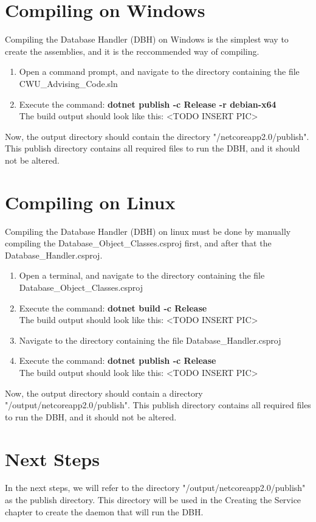 \documentclass[letterpaper]{report}
\begin{document}
	\section{Compiling on Windows}
	Compiling the Database Handler (DBH) on Windows is the simplest way to create the assemblies, and it is the reccommended way of compiling. 
	\begin{enumerate}
		\item Open a command prompt, and navigate to the directory containing the file CWU\_Advising\_Code.sln
		\item Execute the command: \textbf{dotnet publish -c Release -r debian-x64 }\\ The build output should look like this: <TODO INSERT PIC> \\
	\end{enumerate}
	Now, the output directory should contain the directory "/netcoreapp2.0/publish". This publish directory contains all required files to run the DBH, and it should not be altered.
	\section{Compiling on Linux}
	Compiling the Database Handler (DBH) on linux must be done by manually compiling the Database\_Object\_Classes.csproj first, and after that the Database\_Handler.csproj. 
	\begin{enumerate}
		\item Open a terminal, and navigate to the directory containing the file Database\_Object\_Classes.csproj
		\item Execute the command: \textbf{dotnet build -c Release}\\ The build output should look like this: <TODO INSERT PIC> \\
		\item Navigate to the directory containing the file Database\_Handler.csproj
		\item Execute the command: \textbf{dotnet publish -c Release}\\ The build output should look like this: <TODO INSERT PIC> \\
	\end{enumerate}
	Now, the output directory should contain a directory "/output/netcoreapp2.0/publish". This publish directory contains all required files to run the DBH, and it should not be altered.
	\section{Next Steps}
	In the next steps, we will refer to the directory "/output/netcoreapp2.0/publish" as the publish directory. This directory will be used in the Creating the Service chapter to create the daemon that will run the DBH.
	
\end{document}
